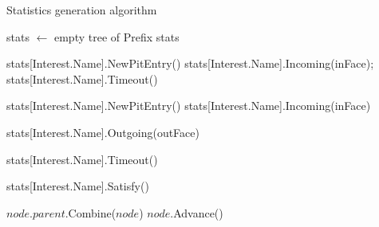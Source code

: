 
\begin{algorithm}[h]
\caption{Statistics generation algorithm}
\label{algo:stats}
\begin{algorithmic}[1]

\State stats $\leftarrow$ empty tree of Prefix stats 

\vspace{0.2cm}
  \State stats[Interest.Name].NewPitEntry()
  \State stats[Interest.Name].Incoming(inFace);
  \State stats[Interest.Name].Timeout()
\EndFunction

\vspace{0.2cm}
  \State stats[Interest.Name].NewPitEntry()
  \State stats[Interest.Name].Incoming(inFace)
\EndFunction

\vspace{0.2cm}
  \State stats[Interest.Name].Outgoing(outFace)
\EndFunction

\vspace{0.2cm}
  \State stats[Interest.Name].Timeout()
\EndFunction

\vspace{0.2cm}
  \State stats[Interest.Name].Satisfy()
\EndFunction

\vspace{0.2cm}
    \State $node.parent.$Combine($node$)
    \State $node.$Advance()
\EndFor
\EndFunction


\end{algorithmic}
\end{algorithm}

